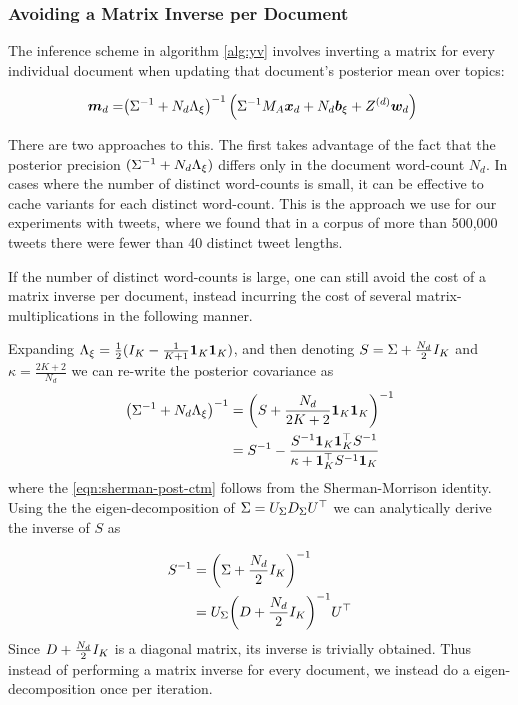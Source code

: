 \subsubsection{Avoiding a Matrix Inverse per Document}
The inference scheme in algorithm \ref{alg:yv} involves inverting a matrix for every individual document when updating that document's posterior mean over topics:

\begin{align}
 \bm m_d = & {\left( {\Sigma}^{-1} + N_d { \Lambda_{\xi} } \right)}^{-1} \left({\Sigma}^{-1} M_A { \bm x_d }  + N_d { \bm b_{\xi} } + Z^{(d)}\bm w_d \right )
\end{align}

There are two approaches to this. The first takes advantage of the fact that the posterior precision $({\Sigma}^{-1} + N_d { \Lambda_{\xi} })$ differs only in the document word-count $N_d$. In cases where the number of distinct word-counts is small, it can be effective to cache variants for each distinct word-count. This is the approach we use for our experiments with tweets, where  we found that in a corpus of more than 500,000 tweets there were fewer than 40 distinct tweet lengths.

If the number of distinct word-counts is large, one can still avoid the cost of a matrix inverse per document, instead incurring the cost of several matrix-multiplications in the following manner.

Expanding ${ \Lambda_{\xi} } = \frac{1}{2}(I_K - \frac{1}{ {K+1} } \mathbf{1}_K \mathbf{1}_K)$, and then denoting $S = \Sigma + \frac{N_d}{2} I_K$ and $\kappa = \frac{2K + 2}{N_d}$ we can re-write the posterior covariance as
\begin{align}
{\left(  {\Sigma}^{-1}  + N_d  { \Lambda_{\xi} } \right)}^{-1} & =
{\left( S + \frac{N_d}{2K + 2} \mathbf{1}_K \mathbf{1}_K \right)}^{-1} \\
& = {S}^{-1} - \frac{{S}^{-1}\mathbf{1}_K\mathbf{1}_K^\top{S}^{-1}}{\kappa+ \mathbf{1}_K^\top {S}^{-1} \mathbf{1}_K} \label{eqn:sherman-post-ctm}
\end{align}
where the \eqref{eqn:sherman-post-ctm} follows from the Sherman-Morrison identity. Using the the eigen-decomposition of $\Sigma = U_\Sigma D_\Sigma U^\top$ we can analytically derive the inverse of $S$ as

\begin{align}
{S}^{-1} 
& = {\left( \Sigma + \frac{N_d}{2}I_K \right)}^{-1} \\
& = U_\Sigma {\left( D +  \frac{N_d}{2} I_K \right)}^{-1} U^\top
\end{align}
Since $D + \frac{N_d}{2}I_K$ is a diagonal matrix, its inverse is trivially obtained. Thus instead of performing a matrix inverse for every document, we instead do a eigen-decomposition once per iteration.


